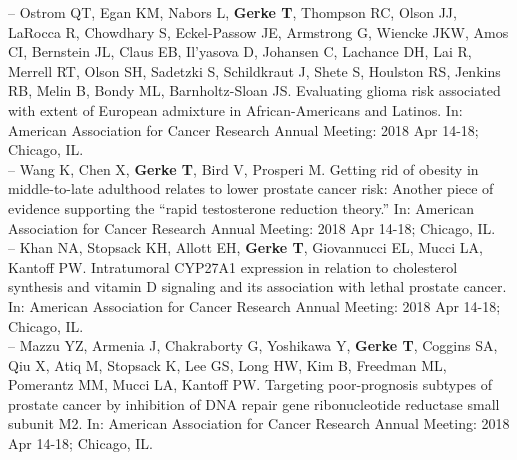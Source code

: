 \documentclass[11pt, a4paper]{article} %
\begin{document}
-- Ostrom QT, Egan KM, Nabors L, {\bf Gerke T}, Thompson RC, Olson JJ, LaRocca R, Chowdhary S, Eckel-Passow JE, Armstrong G, Wiencke JKW, Amos CI, Bernstein JL, Claus EB, Il'yasova D, Johansen C, Lachance DH, Lai R, Merrell RT, Olson SH, Sadetzki S, Schildkraut J, Shete S, Houlston RS, Jenkins RB, Melin B, Bondy ML, Barnholtz-Sloan JS. Evaluating glioma risk associated with extent of European admixture in African-Americans and Latinos. In: American Association for Cancer Research Annual Meeting: 2018 Apr 14-18; Chicago, IL.\\

-- Wang K, Chen X, {\bf Gerke T}, Bird V, Prosperi M.  Getting rid of obesity in middle-to-late adulthood relates to lower prostate cancer risk: Another piece of evidence supporting the ``rapid testosterone reduction theory.'' In: American Association for Cancer Research Annual Meeting: 2018 Apr 14-18; Chicago, IL.\\

-- Khan NA, Stopsack KH, Allott EH, {\bf Gerke T}, Giovannucci EL, Mucci LA, Kantoff PW. Intratumoral CYP27A1 expression in relation to cholesterol synthesis and vitamin D signaling and its association with lethal prostate cancer. In: American Association for Cancer Research Annual Meeting: 2018 Apr 14-18; Chicago, IL.\\

-- Mazzu YZ, Armenia J, Chakraborty G, Yoshikawa Y, {\bf Gerke T}, Coggins SA, Qiu X, Atiq M, Stopsack K, Lee GS, Long HW, Kim B, Freedman ML, Pomerantz MM, Mucci LA, Kantoff PW. Targeting poor-prognosis subtypes of prostate cancer by inhibition of DNA repair gene ribonucleotide reductase small subunit M2. In: American Association for Cancer Research Annual Meeting: 2018 Apr 14-18; Chicago, IL.
\end{document}

